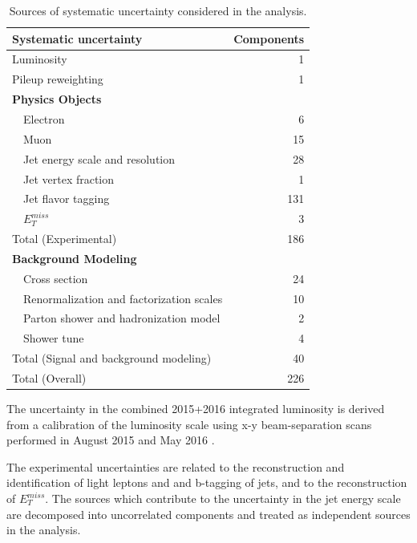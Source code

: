 \documentclass[NOTE, atlasdraft=true, texlive=2016, UKenglish]{\ATLASLATEXPATH atlasdoc}
\begin{document}
\begin{table}[h]
\centering
\caption{Sources of systematic uncertainty considered in the analysis.}
\begin{tabular}{lr}
\hline\hline
Systematic uncertainty & Components  	      \\
\hline
\hline
Luminosity	& 1		      \\
Pileup reweighting 	& 1		      \\
\textbf {Physics Objects}     	&		      \\
\ \ Electron                               	& 6		      \\
\ \ Muon	& 15		      \\
\ \ Jet energy scale and resolution  	& 28                  \\
\ \ Jet vertex fraction  	& 1		      \\
\ \ Jet flavor tagging   	& 131		      \\
\ \ $E^{miss}_T$  	& 3		      \\
\hline
Total (Experimental)        & 186		     \\
\hline
\hline
\textbf {Background Modeling}          	&		      \\
\ \ Cross section                 	& 24		      \\
\ \ Renormalization and factorization scales 	& 10		      \\
\ \ Parton shower and hadronization model       	& 2		      \\
\ \ Shower tune				& 4		      \\
\hline
Total (Signal and background modeling)       & 40		     \\
\hline\hline
Total (Overall)                             & 226	      \\
\hline\hline
\end{tabular}
\label{tab:SystSummary}
\end{table}

The uncertainty in the combined 2015+2016 integrated luminosity is derived from a calibration of the luminosity scale using x-y beam-separation scans performed in August 2015 and May 2016 \cite{lumi}.

The experimental uncertainties are related to the reconstruction and identification of light leptons and
 and b-tagging of jets, and to the reconstruction of $E^{miss}_T$. The sources which contribute to the uncertainty in the jet energy scale \cite{jes} are decomposed into uncorrelated components and treated as independent sources in the analysis. 
\end{document}

